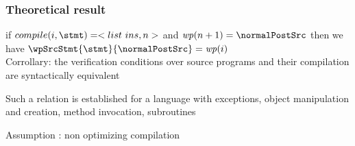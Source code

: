 \documentclass{beamer}
\begin{document}
\begin{frame}\frametitle{Theoretical result}
\begin{theorem}
  if $compile(i, \stmt) = <list \ ins, n>  $ and  $\wpi(n+1) = \normalPostSrc$  then  we have 
      $ \wpSrcStmt{ \stmt}{\normalPostSrc }  = \wpi(i)  $
\\
\vspace{3ex} Corrollary:
 the verification conditions over  source programs and their compilation are syntactically equivalent 
   
 \end{theorem}
  Such a relation is established for a language with exceptions, object manipulation and creation, method invocation, subroutines
 
  Assumption : non optimizing compilation 

\end{frame}
\end{document}
